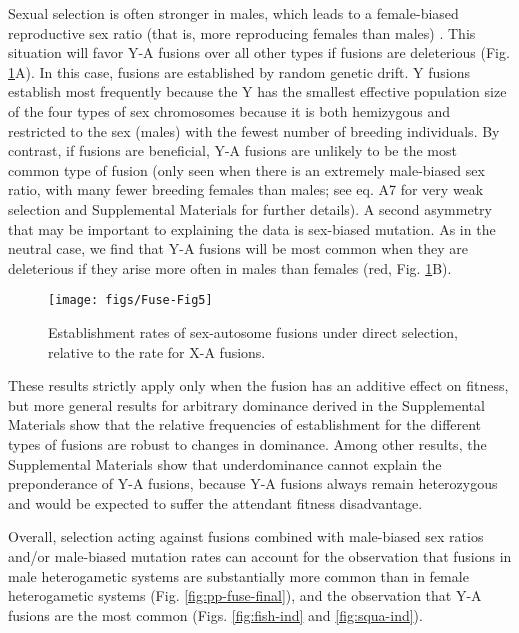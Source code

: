 Sexual selection is often stronger in males, which leads to a female-biased reproductive sex ratio (that is, more reproducing females than males) \citep{Bateman1948}. This situation will favor Y-A fusions over all other types if fusions are deleterious (Fig. \ref{fig:fuse-direct}A). In this case, fusions are established by random genetic drift. Y fusions establish most frequently because the Y has the smallest effective population size of the four types of sex chromosomes because it is both hemizygous and restricted to the sex (males) with the fewest number of breeding individuals. By contrast, if fusions are beneficial, Y-A fusions are unlikely to be the most common type of fusion (only seen when there is an extremely male-biased sex ratio, with many fewer breeding females than males; see eq. A7 for very weak selection and Supplemental Materials for further details). A second asymmetry that may be important to explaining the data is sex-biased mutation. As in the neutral case, we find that Y-A fusions will be most common when they are deleterious if they arise more often in males than females (red, Fig. \ref{fig:fuse-direct}B). 

\begin{figure}
\centering
\texttt{[image: figs/Fuse-Fig5]}
\caption[Establishment rates of sex-autosome fusions under direct selection]{Establishment rates of sex-autosome fusions under direct selection, relative to the rate for X-A fusions.}
\label{fig:fuse-direct}
\end{figure}

These results strictly apply only when the fusion has an additive effect on fitness, but more general results for arbitrary dominance derived in the Supplemental Materials show that the relative frequencies of establishment for the different types of fusions are robust to changes in dominance. Among other results, the Supplemental Materials show that underdominance cannot explain the preponderance of Y-A fusions, because Y-A fusions always remain heterozygous and would be expected to suffer the attendant fitness disadvantage. 

Overall, selection acting against fusions combined with male-biased sex ratios and/or male-biased mutation rates can account for the observation that fusions in male heterogametic systems are substantially more common than in female heterogametic systems (Fig. \ref{fig:pp-fuse-final}), and the observation that Y-A fusions are the most common (Figs. \ref{fig:fish-ind} and \ref{fig:squa-ind}). 

